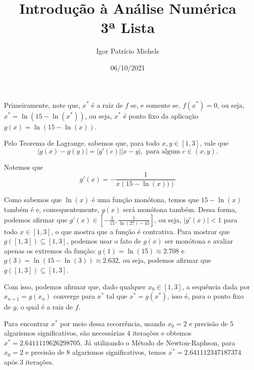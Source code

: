\documentclass{article}
\title{Introdução à Análise Numérica \\ 3ª Lista}
\author{Igor Patrício Michels}
\date{06/10/2021}
\begin{document}
\maketitle

Primeiramente, note que, $x^*$ é a raiz de $f$ se, e somente se, $f(x^*) = 0$, ou seja, $x^* = \ln{\left(15 - \ln{\left(x^*\right)}\right)}$, ou seja, $x^*$ é ponto fixo da aplicação $g(x) = \ln{\left(15 - \ln{\left(x\right)}\right)}$.

Pelo Teorema de Lagrange, sabemos que, para todo $x, y\in [1, 3]$, vale que
\[|g(x) - g(y)| = |g'(c)| |x - y|, \text{ para algum } c\in (x, y).\]

Notemos que
\[g'(x) = -\dfrac{1}{x\left(15 - \ln{\left(x\right)})\right)}\]

Como sabemos que $\ln{\left(x\right)}$ é uma função monótona, temos que $15 - \ln{\left(x\right)}$ também é e, consequentemente, $g(x)$ será monótona também. Dessa forma, podemos afirmar que $g'(x) \in \left[-\frac{1}{15}, \frac{1}{\ln{(27)} - 45}\right]$, ou seja, $|g'(x)| < 1$ para todo $x\in [1, 3]$, o que mostra que a função é contrativa. Para mostrar que $g\left([1, 3]\right)\subseteq [1, 3]$, podemos usar o fato de $g(x)$ ser monótona e avaliar apenas os extremos da função: $g(1) = \ln{(15)}\approx 2.708$ e $g(3) = \ln{\left(15 - \ln{(3)}\right)}\approx 2.632$, ou seja, podemos afirmar que $g\left([1, 3]\right)\subseteq [1, 3]$.

Com isso, podemos afirmar que, dado qualquer $x_0\in [1, 3]$, a sequência dada por $x_{n + 1} = g(x_n)$ converge para $x^*$ tal que $x^* = g(x^*)$, isso é, para o ponto fixo de $g$, o qual é a raiz de $f$.

Para encontrar $x^*$ por meio dessa recorrência, usando $x_0 = 2$ e precisão de $5$ algarismos significativos, são necessárias $4$ iterações e obtemos $x^* = 2.6411119626298705$. Já utilizando o Método de Newton-Raphson, para $x_0 = 2$ e precisão de $8$ algarismos significativos, temos $x^* = 2.641112347187374$ após $3$ iterações.
\end{document}
